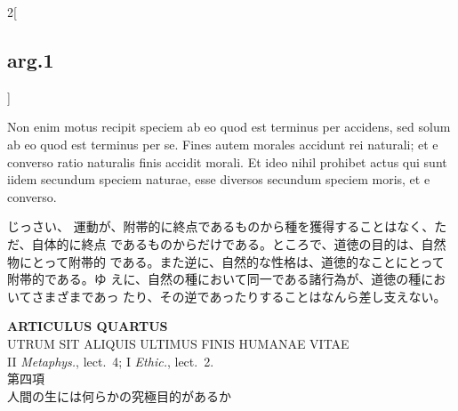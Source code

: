 \documentclass[paper=a4paper,fontsize=10pt,jafontsize=9pt,titlepage]{jlreq}
\begin{document}
\begin{paracol}{2}[\subsection{arg.1}]
\switchcolumn*

Non enim motus recipit speciem ab eo quod
est terminus per accidens, sed solum ab eo quod est terminus per
se. Fines autem morales accidunt rei naturali; et e converso ratio
naturalis finis accidit morali. Et ideo nihil prohibet actus qui sunt
iidem secundum speciem naturae, esse diversos secundum speciem moris, et
e converso.

\switchcolumn

じっさい、 運動が、附帯的に終点であるものから種を獲得することはなく、ただ、自体的に終点
 であるものからだけである。ところで、道徳の目的は、自然物にとって附帯的
 である。また逆に、自然的な性格は、道徳的なことにとって附帯的である。ゆ
 えに、自然の種において同一である諸行為が、道徳の種においてさまざまであっ
 たり、その逆であったりすることはなんら差し支えない。

\end{paracol}
\newpage


{}
\setcounter{section}{4}
\setcounter{subsection}{0}
\begin{center}
 {\Large {\bfseries ARTICULUS QUARTUS}}\\
 {\large UTRUM SIT ALIQUIS ULTIMUS FINIS HUMANAE VITAE}\\
 {\footnotesize II {\itshape Metaphys.}, lect.~4; I {\itshape Ethic.}, lect.~2.}\\
 {\Large 第四項\\人間の生には何らかの究極目的があるか}
\end{center}
\end{document}
